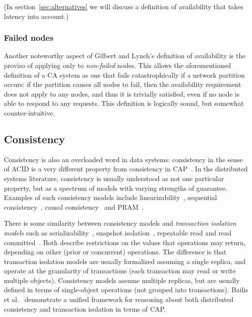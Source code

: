 \documentclass[a4paper,twocolumn,10pt]{article}
\begin{document}
(In section~\ref{sec:alternatives} we will discuss a definition of availability that takes latency
into account.)

\subsubsection{Failed nodes}\label{sec:failed-node-exception}

Another noteworthy aspect of Gilbert and Lynch's definition of availability is the proviso of
applying only to \emph{non-failed} nodes. This allows the aforementioned definition of a CA system
as one that fails catastrophically if a network partition occurs: if the partition causes all nodes
to fail, then the availability requirement does not apply to any nodes, and thus it is trivially
satisfied, even if no node is able to respond to any requests. This definition is logically sound,
but somewhat counter-intuitive.

\subsection{Consistency}\label{sec:consistency}

Consistency is also an overloaded word in data systems: consistency in the sense of ACID is a very
different property from consistency in CAP~\cite{Brewer2012ba}. In the distributed systems
literature, consistency is usually understood as not one particular property, but as a spectrum of
models with varying strengths of guarantee. Examples of such consistency models include
linearizability~\cite{Herlihy1990jq}, sequential consistency~\cite{Lamport1979ky}, causal
consistency~\cite{Ahamad1995gl} and PRAM~\cite{Lipton1988uh}.

There is some similarity between consistency models and \emph{transaction isolation models} such as
serializability~\cite{Bernstein1987va}, snapshot isolation~\cite{Berenson1995kj}, repeatable read
and read committed~\cite{Adya1999tx, Gray1976us}. Both describe restrictions on the values that
operations may return, depending on other (prior or concurrent) operations. The difference is that
transaction isolation models are usually formalized assuming a single replica, and operate at the
granularity of transactions (each transaction may read or write multiple objects). Consistency
models assume multiple replicas, but are usually defined in terms of single-object operations (not
grouped into transactions). Bailis et al.~\cite{Bailis2014vc} demonstrate a unified framework for
reasoning about both distributed consistency and transaction isolation in terms of CAP.
\end{document}
